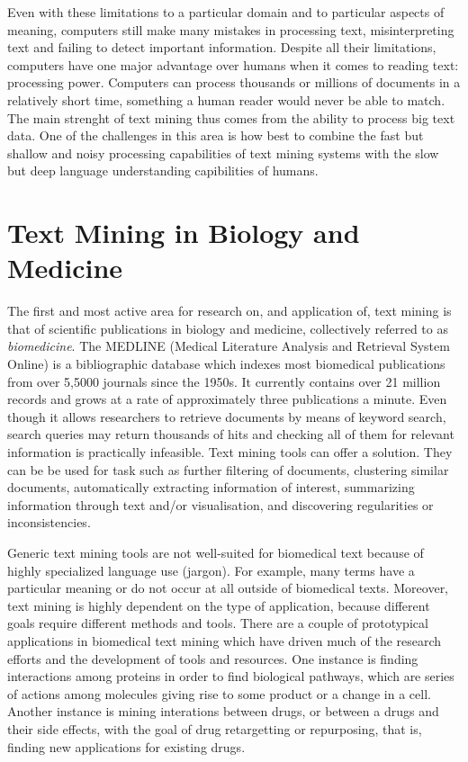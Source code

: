 \documentclass[11pt,twoside,a4paper]{report}
\newcommand{\EM}[1]{\todo[inline,author=EM,color=yellow]{#1}}
\begin{document}
Even with these limitations to a particular domain and to particular aspects of meaning, computers still make many mistakes in processing text, misinterpreting text and failing to detect important information.
Despite all their limitations, computers have one major advantage over humans when it comes to reading text: processing power. 
Computers can process thousands or millions of documents in a relatively short time, something a human reader would never be able to match.
The main strenght of text mining thus comes from the ability to process big text data.
One of the challenges in this area is how best to combine the fast but shallow and noisy processing capabilities of text mining systems with the slow but deep language understanding capibilities of humans.

\section{Text Mining in Biology and Medicine}

The first and most active area for research on, and application of, text mining is that of scientific publications in biology and medicine, collectively referred to as \emph{biomedicine}.
The MEDLINE (Medical Literature Analysis and Retrieval System Online) is a bibliographic database which indexes most biomedical publications from over 5,5000 journals since the 1950s.  
It currently contains over 21 million records and grows at a rate of approximately three publications a minute.\EM{ref}
Even though it allows researchers to retrieve documents by means of keyword search, search queries may return thousands of hits and checking all of them for relevant information is practically infeasible.
Text mining tools can offer a solution.
They can be be used for task such as further filtering of documents, clustering similar documents, automatically extracting information of interest, summarizing information through text and/or visualisation, and discovering regularities or inconsistencies.

Generic text mining tools are not well-suited for biomedical text because of highly specialized language use (jargon). 
For example, many terms have a particular meaning or do not occur at all outside of biomedical texts.
Moreover, text mining is highly dependent on the type of application, because different goals require different methods and tools.
There are a couple of prototypical applications in biomedical text mining which have driven much of the research efforts and the development of tools and resources.
One instance is finding interactions among proteins in order to find biological pathways, which are series of actions among molecules giving rise to some product or a change in a cell.
Another instance is mining interations between drugs, or between a drugs and their side effects, with the goal of drug retargetting or repurposing, that is, finding new applications for existing drugs.
\end{document}
